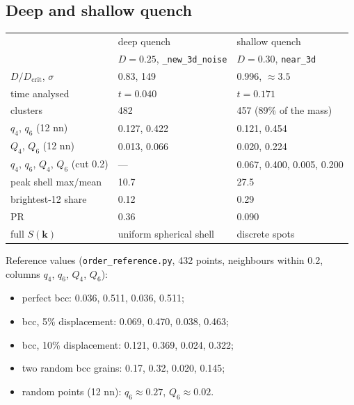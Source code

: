\documentclass[11pt]{article}
\newcommand{\code}[1]{\texttt{#1}}
\newcommand{\Dc}{D_{\mathrm{crit}}}
\begin{document}
\subsection{Deep and shallow quench}
\begin{center}
\begin{tabular}{@{}lll@{}}
\toprule
& deep quench & shallow quench \\
& $D=0.25$, \code{\_new\_3d\_noise} & $D=0.30$, \code{near\_3d} \\
\midrule
$D/\Dc$, $\sigma$ & 0.83, 149 & 0.996, $\approx3.5$ \\
time analysed & $t=0.040$ & $t=0.171$ \\
clusters & 482 & 457 (89\% of the mass) \\
$q_4$, $q_6$ (12 nn) & 0.127, 0.422 & 0.121, 0.454 \\
$Q_4$, $Q_6$ (12 nn) & 0.013, 0.066 & 0.020, 0.224 \\
$q_4$, $q_6$, $Q_4$, $Q_6$ (cut 0.2) & --- & 0.067, 0.400, 0.005, 0.200 \\
peak shell max/mean & 10.7 & 27.5 \\
brightest-12 share & 0.12 & 0.29 \\
PR & 0.36 & 0.090 \\
full $S(\mathbf k)$ & uniform spherical shell & discrete spots \\
\bottomrule
\end{tabular}
\end{center}
Reference values (\code{order\_reference.py}, 432 points, neighbours within
0.2, columns $q_4$, $q_6$, $Q_4$, $Q_6$):
\begin{itemize}[nosep]
  \item perfect bcc: 0.036, 0.511, 0.036, 0.511;
  \item bcc, 5\% displacement: 0.069, 0.470, 0.038, 0.463;
  \item bcc, 10\% displacement: 0.121, 0.369, 0.024, 0.322;
  \item two random bcc grains: 0.17, 0.32, 0.020, 0.145;
  \item random points (12 nn): $q_6\approx0.27$, $Q_6\approx0.02$.
\end{itemize}
\end{document}
